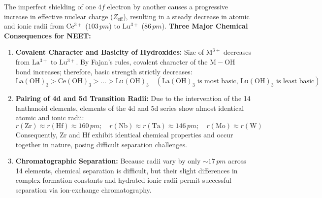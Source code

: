 \documentclass[10pt,a4paper]{article}
\begin{document}
\begin{ncertbox}
The imperfect shielding of one $4f$ electron by another causes a progressive increase in effective nuclear charge ($Z_{\mathrm{eff}}$), resulting in a steady decrease in atomic and ionic radii from $\mathrm{Ce^{3+}}$ ($103\,\si{pm}$) to $\mathrm{Lu^{3+}}$ ($86\,\si{pm}$).
\textbf{Three Major Chemical Consequences for NEET:}
\begin{enumerate}
  \item \textbf{Covalent Character and Basicity of Hydroxides:} Size of $\mathrm{M^{3+}}$ decreases from $\mathrm{La^{3+}}$ to $\mathrm{Lu^{3+}}$. By Fajan's rules, covalent character of the $\mathrm{M-OH}$ bond increases; therefore, basic strength strictly decreases:
  \begin{equation*}
    \mathrm{La(OH)_3 > Ce(OH)_3 > \dots > Lu(OH)_3} \quad (\mathrm{La(OH)_3}\text{ is most basic, }\mathrm{Lu(OH)_3}\text{ is least basic})
  \end{equation*}
  \item \textbf{Pairing of 4d and 5d Transition Radii:} Due to the intervention of the 14 lanthanoid elements, elements of the 4d and 5d series show almost identical atomic and ionic radii:
  \begin{equation*}
    r(\mathrm{Zr}) \approx r(\mathrm{Hf}) \approx 160\,\si{pm}; \quad r(\mathrm{Nb}) \approx r(\mathrm{Ta}) \approx 146\,\si{pm}; \quad r(\mathrm{Mo}) \approx r(\mathrm{W})
  \end{equation*}
  Consequently, $\mathrm{Zr}$ and $\mathrm{Hf}$ exhibit identical chemical properties and occur together in nature, posing difficult separation challenges.
  \item \textbf{Chromatographic Separation:} Because radii vary by only $\sim 17\,\si{pm}$ across 14 elements, chemical separation is difficult, but their slight differences in complex formation constants and hydrated ionic radii permit successful separation via ion-exchange chromatography.
\end{enumerate}
\end{ncertbox}
\end{document}
